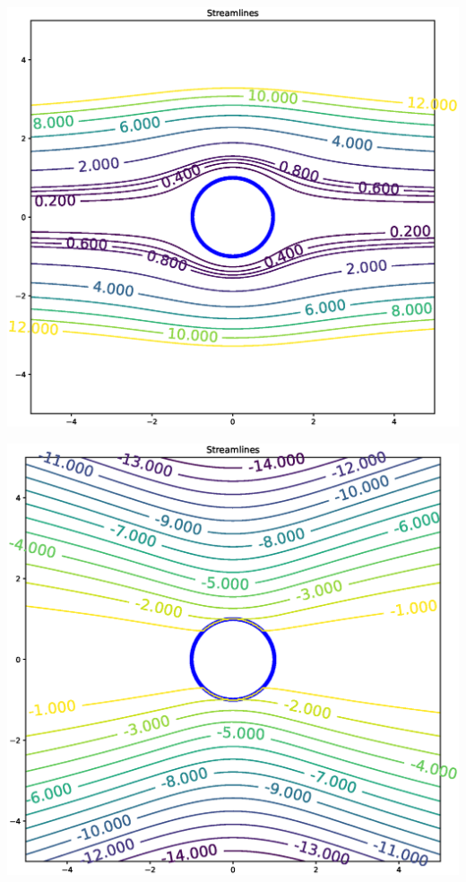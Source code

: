 \includegraphics[width=0.8\linewidth]{figures/creeping_flow_past_sphere}

\includegraphics[width=0.8\linewidth]{figures/creeping_flow_past_sphere_moving}
